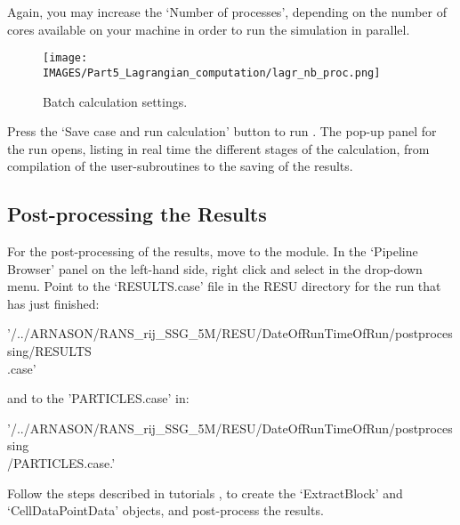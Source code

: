 Again, you may increase the ‘Number of processes’, depending on the number of cores available on your machine in order to run the simulation in parallel.

\begin{figure}[H]
\centering
\texttt{[image: \\IMAGES/Part5\_Lagrangian\_computation/lagr\_nb\_proc.png]}
\caption{Batch calculation settings.}\label{lag:batch_calculation_setting}
\end{figure}

Press the ‘Save case and run calculation’ button to run \CS.  The pop-up panel for the run opens, listing in real time the different stages of the calculation, from compilation of the user-subroutines to the saving of the results.

\subsection{Post-processing the Results}

For the post-processing of the results, move to the \paravis module.  In the ‘Pipeline Browser’ panel on the left-hand side, right click and select  in the drop-down menu.  Point to the ‘RESULTS.case’ file in the RESU directory for the run that has just finished:

'/../ARNASON/RANS\_rij\_SSG\_5M/RESU/DateOfRunTimeOfRun/postprocessing/RESULTS\\.case'

and to the 'PARTICLES.case' in:

'/../ARNASON/RANS\_rij\_SSG\_5M/RESU/DateOfRunTimeOfRun/postprocessing\\/PARTICLES.case.'

Follow the steps described in tutorials \cite{ShearDriven_Tuto, HeatedDriven_Tuto}, to create the ‘ExtractBlock’ and ‘CellDataPointData’ objects, and post-process the results.


